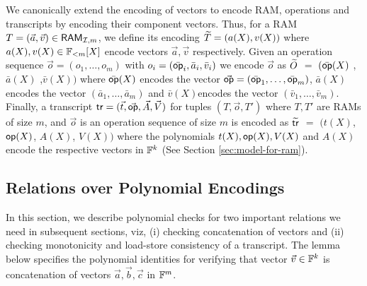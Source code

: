We canonically extend the encoding of vectors to encode RAM, operations and transcripts by encoding their component vectors.
Thus, for a RAM $T=(\vec{a},\vec{v})\in \mathsf{RAM}_{\mathcal{I}, {m}}$, we define its encoding
$\widetilde{T}=(a(X),v(X))$ where $a(X),v(X)\in \mathbb{F}_{<m}[X]$ encode vectors $\vec{a}, \vec{v}$ respectively.
Given an operation sequence
$\vec{o}=(o_1,\ldots,o_m)$ with $o_i=(\bar{\mathsf{op}}_i,\bar{a}_i,\bar{v}_i)$ we encode $\vec{o}$ as
$\widetilde{O}$ $=$ $(\bar{\mathsf{op}}(X)$ ,$\bar{a}(X)$ ,$\bar{v}(X))$
where $\bar{\mathsf{op}}(X)$ encodes the
vector $\vec{\mathsf{op}}=(\bar{\mathsf{op}}_1,\ldots,\bar{\mathsf{op}}_m)$, $\bar{a}(X)$ encodes the vector $(\bar{a}_1,\ldots,\bar{a}_m)$ and
$\bar{v}(X)$encodes the vector $(\bar{v}_1,\ldots,\bar{v}_m)$.
Finally, a transcript $\mathsf{tr}=(\vec{t},\vec{\mathsf{op}},\vec{A},\vec{V})$ for tuples $(T,\vec{o},T')$ where $T,T'$ are RAMs of size $m$,
and $\vec{o}$ is an operation sequence of size $m$ is encoded as $\widetilde{\mathsf{tr}}$ $=$ $(t(X)$, $\mathsf{op}(X)$, $A(X)$, $V(X))$
where the polynomials $t(X),\mathsf{op}(X),V(X)$ and $A(X)$ encode the respective vectors in $\mathbb{F}^k$ (See Section \ref{sec:model-for-ram}).

\subsection{Relations over Polynomial Encodings}\label{subsec:encoded-relations}
In this section, we describe polynomial checks for two important relations we need in subsequent sections, viz,
(i) checking concatenation of vectors and (ii) checking monotonicity and load-store consistency of a transcript.
The lemma below specifies the polynomial identities for verifying
that vector $\vec{v}\in \mathbb{F}^k$ is concatenation of vectors $\vec{a},\vec{b},\vec{c}$ in $\mathbb{F}^m$.

